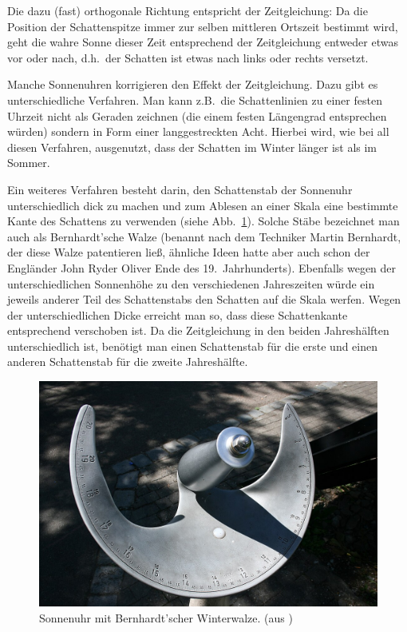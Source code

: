 Die dazu (fast) orthogonale Richtung entspricht der Zeitgleichung: Da die Position der Schattenspitze
immer zur selben mittleren Ortszeit bestimmt wird, geht die wahre Sonne dieser Zeit entsprechend
der Zeitgleichung entweder etwas vor oder nach, d.h.\ der Schatten ist etwas nach links oder
rechts versetzt. 

Manche Sonnenuhren korrigieren den Effekt der Zeitgleichung. Dazu gibt es unterschiedliche
Verfahren. Man kann z.B.\ die Schattenlinien zu einer festen Uhrzeit nicht als Geraden zeichnen
(die einem festen L\"angengrad entsprechen w\"urden) sondern in Form einer langgestreckten
Acht. Hierbei wird, wie bei all diesen Verfahren, ausgenutzt, dass der Schatten im Winter l\"anger
ist als im Sommer. 

Ein weiteres Verfahren besteht darin, den Schattenstab der Sonnenuhr unterschiedlich dick
zu machen und zum Ablesen an einer Skala eine bestimmte Kante des Schattens zu 
verwenden (siehe Abb.\ \ref{fig_Bernhardt}).
Solche St\"abe bezeichnet man auch als Bernhardt'sche Walze (benannt nach dem Techniker
Martin Bernhardt, 
der diese Walze patentieren lie\ss, \"ahnliche Ideen hatte aber auch schon
der Engl\"ander John Ryder Oliver Ende des 19.\ Jahrhunderts). 
Ebenfalls wegen der unterschiedlichen Sonnenh\"ohe zu den verschiedenen Jahreszeiten
w\"urde ein jeweils anderer Teil des Schattenstabs den Schatten auf die Skala werfen. Wegen
der unterschiedlichen Dicke erreicht man so, dass diese Schattenkante entsprechend 
verschoben ist. Da die Zeitgleichung in den beiden Jahresh\"alften unterschiedlich ist, ben\"otigt
man einen Schattenstab f\"ur die erste und einen anderen Schattenstab f\"ur die zweite
Jahresh\"alfte.   

\begin{figure}
\includegraphics[scale=0.2]{./Bilder/Bernhardt.jpg}
\caption{\label{fig_Bernhardt}%
Sonnenuhr mit Bernhardt'scher Winterwalze. (aus \cite{Wikipedia_Sonnenuhr})}
\end{figure}

